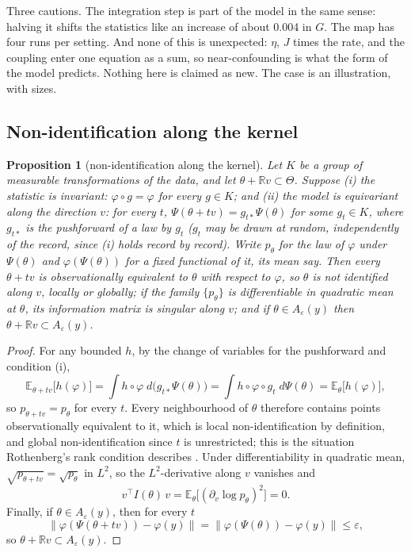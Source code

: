\documentclass[11pt]{article}
\newtheorem{proposition}{Proposition}
\newenvironment{newtext}{\par\color{teal!55!black}}{\par}
\begin{document}
\begin{newtext}
Three cautions. The integration step is part of the model in the same sense: halving it shifts the statistics like an increase of about 0.004 in $G$. The map has four runs per setting. And none of this is unexpected: $\eta$, $J$ times the rate, and the coupling enter one equation as a sum, so near-confounding is what the form of the model predicts. Nothing here is claimed as new. The case is an illustration, with sizes.
\end{newtext}

\subsection{Non-identification along the kernel}\label{sec:kernel}
\begin{proposition}[non-identification along the kernel]
Let $K$ be a group of measurable transformations of the data, and let $\theta+\mathbb{R}v\subset\Theta$. Suppose (i) the statistic is \emph{invariant}: $\varphi\circ g=\varphi$ for every $g\in K$; and (ii) the model is \emph{equivariant along the direction $v$}: for every $t$, $\Psi(\theta+tv)=g_{t*}\Psi(\theta)$ for some $g_t\in K$, where $g_{t*}$ is the pushforward of a law by $g_t$ ($g_t$ may be drawn at random, independently of the record, since (i) holds record by record). Write $p_\theta$ for the law of $\varphi$ under $\Psi(\theta)$ and $\varphi(\Psi(\theta))$ for a fixed functional of it, its mean say. Then every $\theta+tv$ is observationally equivalent to $\theta$ with respect to $\varphi$, so $\theta$ is not identified along $v$, locally or globally; if the family $\{p_\theta\}$ is differentiable in quadratic mean at $\theta$, its information matrix is singular along $v$; and if $\theta\in A_\varepsilon(y)$ then $\theta+\mathbb{R}v\subset A_\varepsilon(y)$.
\end{proposition}
\begin{proof}
For any bounded $h$, by the change of variables for the pushforward and condition (i),
\[
\mathbb{E}_{\theta+tv}\bigl[h(\varphi)\bigr]=\int h\circ\varphi\;d\bigl(g_{t*}\Psi(\theta)\bigr)=\int h\circ\varphi\circ g_t\;d\Psi(\theta)=\mathbb{E}_{\theta}\bigl[h(\varphi)\bigr],
\]
so $p_{\theta+tv}=p_\theta$ for every $t$. Every neighbourhood of $\theta$ therefore contains points observationally equivalent to it, which is local non-identification by definition, and global non-identification since $t$ is unrestricted; this is the situation Rothenberg's rank condition describes \parencite{rothenberg1971}. Under differentiability in quadratic mean, $\sqrt{p_{\theta+tv}}=\sqrt{p_\theta}$ in $L^2$, so the $L^2$-derivative along $v$ vanishes and
\[
v^{\top}I(\theta)\,v=\mathbb{E}_\theta\bigl[(\partial_v\log p_\theta)^2\bigr]=0.
\]
Finally, if $\theta\in A_\varepsilon(y)$, then for every $t$
\[
\|\varphi(\Psi(\theta+tv))-\varphi(y)\|=\|\varphi(\Psi(\theta))-\varphi(y)\|\le\varepsilon,
\]
so $\theta+\mathbb{R}v\subset A_\varepsilon(y)$.
\end{proof}
\end{document}
